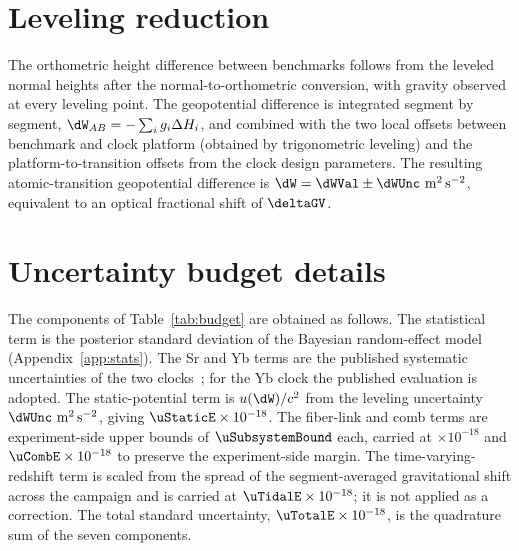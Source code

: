 \section{Leveling reduction}
\label{app:leveling}

The orthometric height difference between benchmarks follows from the
leveled normal heights after the normal-to-orthometric conversion,
with gravity observed at every leveling point. The geopotential
difference is integrated segment by segment,
$\dW_{AB} = -\sum_i g_i \Delta H_i$, and combined with the two local
offsets between benchmark and clock platform (obtained by
trigonometric leveling) and the platform-to-transition offsets from
the clock design parameters. The resulting atomic-transition
geopotential difference is $\dW = \dWVal \pm \dWUnc~\mathrm{m^2\,s^{-2}}$,
equivalent to an optical fractional shift of $\deltaGV$.

\section{Uncertainty budget details}
\label{app:budget}

The components of Table~\ref{tab:budget} are obtained as follows.
The statistical term is the posterior standard deviation of the
Bayesian random-effect model (Appendix~\ref{app:stats}). The Sr and
Yb terms are the published systematic uncertainties of the two
clocks~\citep{jia2026sr, zhu2026yb}; for the Yb clock the published
evaluation is adopted. The static-potential term is
$u(\dW)/c^2$ from the leveling uncertainty
$\dWUnc~\mathrm{m^2\,s^{-2}}$, giving
$\uStaticE \times 10^{-18}$. The fiber-link and comb terms are
experiment-side upper bounds of $\uSubsystemBound$ each, carried at
\uLinkE $\times 10^{-18}$ and $\uCombE \times 10^{-18}$ to preserve the
experiment-side margin. The time-varying-redshift term is scaled from
the spread of the segment-averaged gravitational shift across the
campaign and is carried at $\uTidalE \times 10^{-18}$; it is not
applied as a correction. The total standard uncertainty,
$\uTotalE \times 10^{-18}$, is the quadrature sum of the seven
components.
